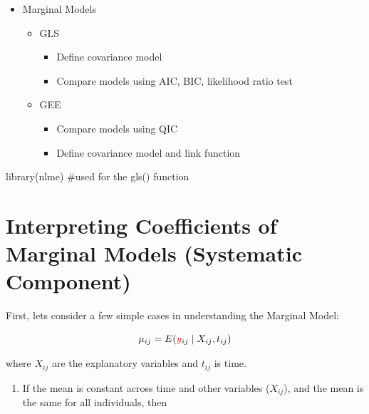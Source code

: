 \documentclass[
  letterpaper,
  DIV=11,
  numbers=noendperiod]{scrreprt}
\newenvironment{Shaded}{\begin{snugshade}}{\end{snugshade}}
\newcommand{\CommentTok}[1]{\textcolor[rgb]{0.37,0.37,0.37}{#1}}
\newcommand{\FunctionTok}[1]{\textcolor[rgb]{0.28,0.35,0.67}{#1}}
\newcommand{\NormalTok}[1]{\textcolor[rgb]{0.00,0.23,0.31}{#1}}
\providecommand{\tightlist}{%
  \setlength{\itemsep}{0pt}\setlength{\parskip}{0pt}}\usepackage{longtable,booktabs,array}
\begin{document}
\begin{itemize}
\tightlist
\item
  Marginal Models

  \begin{itemize}
  \tightlist
  \item
    GLS

    \begin{itemize}
    \tightlist
    \item
      Define covariance model
    \item
      Compare models using AIC, BIC, likelihood ratio test
    \end{itemize}
  \item
    GEE

    \begin{itemize}
    \tightlist
    \item
      Compare models using QIC
    \item
      Define covariance model and link function
    \end{itemize}
  \end{itemize}
\end{itemize}

\begin{Shaded}
\begin{Highlighting}[]
\FunctionTok{library}\NormalTok{(nlme)  }\CommentTok{\#used for the gls() function}
\end{Highlighting}
\end{Shaded}

\hypertarget{interpreting-coefficients-of-marginal-models-systematic-component}{%
\section{Interpreting Coefficients of Marginal Models (Systematic
Component)}\label{interpreting-coefficients-of-marginal-models-systematic-component}}

First, lets consider a few simple cases in understanding the Marginal
Model:

\[\mu_{ij} = E(\textcolor{red}{y}_{ij} \mid {X_{ij},t_{ij}})\]

where \(X_{ij}\) are the explanatory variables and \(t_{ij}\) is time.

\begin{enumerate}
\def\labelenumi{\alph{enumi})}
\tightlist
\item
  If the mean is constant across time and other variables (\(X_{ij}\)),
  and the mean is the same for all individuals, then
\end{enumerate}
\end{document}
